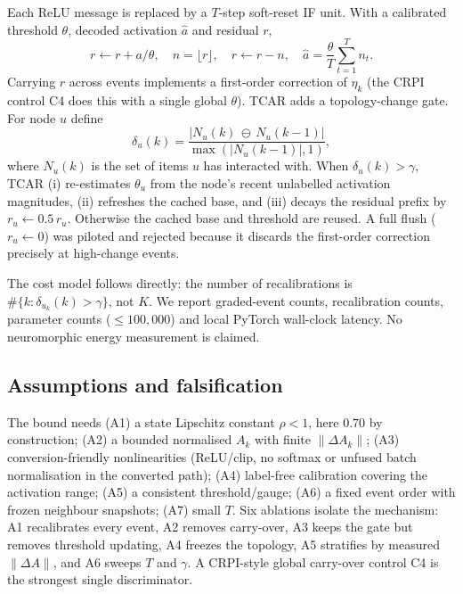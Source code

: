\documentclass[preprint,12pt]{elsarticle}
\begin{document}
Each ReLU message is replaced by a $T$-step soft-reset IF unit. With a calibrated threshold $\theta$, decoded activation $\hat{a}$ and residual $r$,
\begin{equation}
r \leftarrow r + a/\theta,\quad n=\lfloor r \rfloor,\quad r\leftarrow r-n,
\quad \hat{a}=\frac{\theta}{T}\sum_{t=1}^{T} n_t .
\label{eq:if}
\end{equation}
Carrying $r$ across events implements a first-order correction of $\eta_k$ (the CRPI control C4 does this with a single global $\theta$). TCAR adds a topology-change gate. For node $u$ define
\begin{equation}
\delta_u(k)=\frac{|N_u(k)\,\ominus\,N_u(k-1)|}{\max(|N_u(k-1)|,1)} ,
\label{eq:delta}
\end{equation}
where $N_u(k)$ is the set of items $u$ has interacted with. When $\delta_u(k)>\gamma$, TCAR (i) re-estimates $\theta_u$ from the node's recent unlabelled activation magnitudes, (ii) refreshes the cached base, and (iii) decays the residual prefix by $r_u\leftarrow 0.5\,r_u$. Otherwise the cached base and threshold are reused. A full flush ($r_u\leftarrow0$) was piloted and rejected because it discards the first-order correction precisely at high-change events.

The cost model follows directly: the number of recalibrations is $\#\{k:\delta_{u_k}(k)>\gamma\}$, not $K$. We report graded-event counts, recalibration counts, parameter counts ($\le 100{,}000$) and local PyTorch wall-clock latency. No neuromorphic energy measurement is claimed.

\subsection{Assumptions and falsification}
\label{sec:assumptions}

The bound needs (A1) a state Lipschitz constant $\rho<1$, here $0.70$ by construction; (A2) a bounded normalised $A_k$ with finite $\|\Delta A_k\|$; (A3) conversion-friendly nonlinearities (ReLU/clip, no softmax or unfused batch normalisation in the converted path); (A4) label-free calibration covering the activation range; (A5) a consistent threshold/gauge; (A6) a fixed event order with frozen neighbour snapshots; (A7) small $T$. Six ablations isolate the mechanism: A1 recalibrates every event, A2 removes carry-over, A3 keeps the gate but removes threshold updating, A4 freezes the topology, A5 stratifies by measured $\|\Delta A\|$, and A6 sweeps $T$ and $\gamma$. A CRPI-style global carry-over control C4 is the strongest single discriminator.
\end{document}
